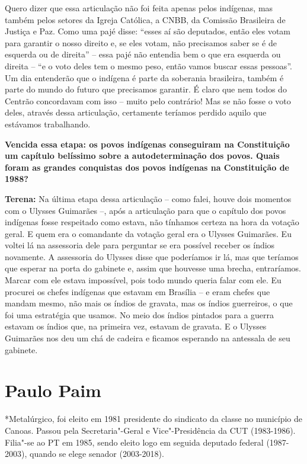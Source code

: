 Quero dizer que essa articulação não foi feita apenas pelos indígenas,
mas também pelos setores da Igreja Católica, a CNBB, da Comissão
Brasileira de Justiça e Paz. Como uma pajé disse: ``esses aí são
deputados, então eles votam para garantir o nosso direito e, se eles
votam, não precisamos saber se é de esquerda ou de direita'' -- essa
pajé não entendia bem o que era esquerda ou direita -- ``e o voto deles
tem o mesmo peso, então vamos buscar essas pessoas''. Um dia entenderão
que o indígena é parte da soberania brasileira, também é parte do mundo
do futuro que precisamos garantir. É claro que nem todos do Centrão
concordavam com isso -- muito pelo contrário! Mas se não fosse o voto
deles, através dessa articulação, certamente teríamos perdido aquilo que
estávamos trabalhando.

\textbf{Vencida essa etapa: os povos indígenas conseguiram na
Constituição um capítulo belíssimo sobre a autodeterminação dos povos.
Quais foram as grandes conquistas dos povos indígenas na Constituição de
1988?}

\textbf{Terena:} Na última etapa dessa articulação -- como falei, houve
dois momentos com o Ulysses Guimarães --, após a articulação para que o
capítulo dos povos indígenas fosse respeitado como estava, não tínhamos
certeza na hora da votação geral. E quem era o comandante da votação
geral era o Ulysses Guimarães. Eu voltei lá na assessoria dele para
perguntar se era possível receber os índios novamente. A assessoria do
Ulysses disse que poderíamos ir lá, mas que teríamos que esperar na
porta do gabinete e, assim que houvesse uma brecha, entraríamos. Marcar
com ele estava impossível, pois todo mundo queria falar com ele. Eu
procurei os chefes indígenas que estavam em Brasília -- e eram chefes
que mandam mesmo, não mais os índios de gravata, mas os índios
guerreiros, o que foi uma estratégia que usamos. No meio dos índios
pintados para a guerra estavam os índios que, na primeira vez, estavam
de gravata. E o Ulysses Guimarães nos deu um chá de cadeira e ficamos
esperando na antessala de seu gabinete.

\section{Paulo Paim}

*Metalúrgico, foi eleito em 1981 presidente do sindicato da classe no
município de Canoas. Passou pela Secretaria"-Geral e Vice"-Presidência da
CUT (1983-1986). Filia"-se ao PT em 1985, sendo eleito logo em seguida
deputado federal (1987-2003), quando se elege senador (2003-2018).


